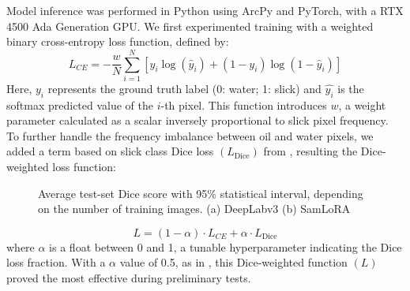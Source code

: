 \documentclass[lettersize,journal]{IEEEtran}
\begin{document}
Model inference was performed in Python using ArcPy and PyTorch, with a RTX 4500 Ada Generation GPU.
We first experimented training with a weighted binary cross-entropy loss function, defined by:
\begin{equation}
    L_\textit{CE} = -\frac{w}{N} \sum_{i=1}^{N} \left[ y_i \log(\hat{y}_i) + (1 - y_i) \log(1 - \hat{y}_i) \right]
\end{equation}
Here, \( y_i \) represents the ground truth label (0: water; 1: slick) and \( \hat{y_i}  \) is the softmax predicted value of the \( i \)-th pixel. This function introduces \( w \), a weight parameter 
calculated as a scalar inversely proportional to slick pixel frequency\cite{azadLossFunctionsEra2023}. To further handle the frequency imbalance between oil and water pixels, 
we added a term based on slick class Dice loss \( (L_\text{Dice}) \) from \cite{milletariVNetFullyConvolutional2016}, resulting the Dice-weighted loss function:
\begin{figure}[!t]
    \centering
    \hfil
    \caption{Average test-set Dice score with 95\% statistical interval, depending on the number of training images. \quad (a) DeepLabv3 \quad (b) SamLoRA }
    \label{figure2}
\end{figure}
\begin{equation}
    L = (1 - \alpha) \cdot L_\textit{CE} + \alpha \cdot L_\text{Dice}
\end{equation}
where $\alpha$ is a float between 0 and 1, a tunable hyperparameter indicating the Dice loss fraction. With a $\alpha$ value of 0.5, as in \cite{taghanakiComboLossHandling2019}, 
this Dice-weighted function \( (L) \) proved the most effective during preliminary tests.
\end{document}
